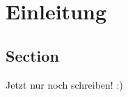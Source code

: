 \chapter{Einleitung} \label{cha:Einleitung}

\lipsum[1]

\section{Section} \label{sec:Section}

Jetzt nur noch schreiben! :)

\lipsum[2-5]